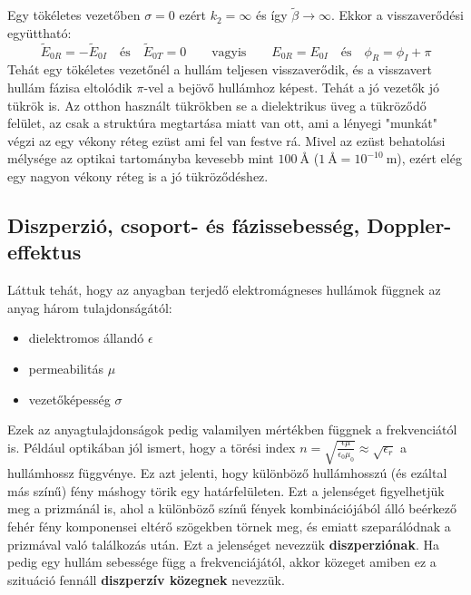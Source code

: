 \documentclass[a4paper,12pt]{article}
\begin{document}
Egy tökéletes vezetőben $\sigma = 0$ ezért $k_2 = \infty$ és így $\tilde{\beta} \rightarrow \infty$. Ekkor a visszaverődési együttható:
\begin{equation}
    \tilde{E}_{0R} = - \tilde{E}_{0I} \quad \text{és} \quad \tilde{E}_{0T} = 0 \qquad \text{vagyis} \qquad E_{0R} = E_{0I} \quad \text{és} \quad \phi_R = \phi_I + \pi
\end{equation}
Tehát egy tökéletes vezetőnél a hullám teljesen visszaverődik, és a visszavert hullám fázisa eltolódik $\pi$-vel a bejövő hullámhoz képest. Tehát a jó vezetők jó tükrök is.
Az otthon használt tükrökben se a dielektrikus üveg a tükröződő felület, az csak a struktúra megtartása miatt van ott, ami a lényegi "munkát" végzi az egy vékony réteg ezüst ami fel van festve rá.
Mivel az ezüst behatolási mélysége az optikai tartományba kevesebb mint $100 \: \text{\AA}$ ($1 \: \text{\AA} = 10^{-10} \: \text{m}$), ezért elég egy nagyon vékony réteg is a jó tükröződéshez.

\subsection{Diszperzió, csoport- és fázissebesség, Doppler-effektus}
Láttuk tehát, hogy az anyagban terjedő elektromágneses hullámok függnek az anyag három tulajdonságától:
\begin{itemize}
    \item dielektromos állandó $\epsilon$
    \item permeabilitás $\mu$
    \item vezetőképesség $\sigma$
\end{itemize}
Ezek az anyagtulajdonságok pedig valamilyen mértékben függnek a frekvenciától is. Például optikában jól ismert, hogy a törési index $n = \sqrt{\frac{\epsilon \mu}{\epsilon_0 \mu_0}} \approx \sqrt{\epsilon_r}$ a hullámhossz függvénye.
Ez azt jelenti, hogy különböző hullámhosszú (és ezáltal más színű) fény máshogy törik egy határfelületen. Ezt a jelenséget figyelhetjük meg a prizmánál is, ahol a különböző színű fények kombinációjából álló
beérkező fehér fény komponensei eltérő szögekben törnek meg, és emiatt szeparálódnak a prizmával való találkozás után. Ezt a jelenséget nevezzük \textbf{diszperziónak}. Ha pedig egy hullám sebessége függ a frekvenciájától, akkor közeget amiben ez a 
szituáció fennáll \textbf{diszperzív közegnek} nevezzük.
\end{document}
